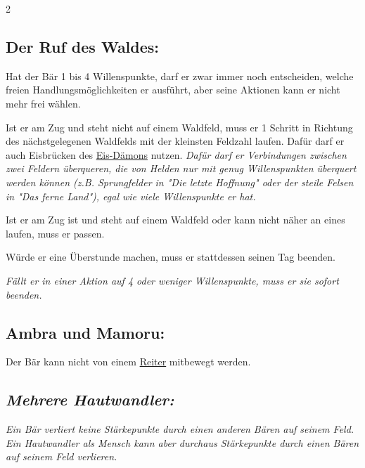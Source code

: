 \documentclass[10pt, a4paper, oneside]{book}
\newcommand{\fan}[1]{\textit{#1}}
\begin{document}
\begin{multicols*}{2}
\begin{nobgcolor}
\subsection{Der Ruf des Waldes:}

Hat der Bär 1 bis 4 Willenspunkte, darf er zwar immer noch entscheiden, welche freien Handlungsmöglichkeiten er ausführt, aber seine Aktionen kann er nicht mehr frei wählen.  

Ist er am Zug und steht nicht auf einem Waldfeld, muss er 1 Schritt in Richtung des nächstgelegenen Waldfelds mit der kleinsten Feldzahl laufen. Dafür darf er auch Eisbrücken des \hyperref[eis-daemon]{Eis-Dämons} nutzen. \fan{Dafür darf er Verbindungen zwischen zwei Feldern überqueren, die von Helden nur mit genug Willenspunkten überquert werden können (z.B. Sprungfelder in "Die letzte Hoffnung" oder der steile Felsen in "Das ferne Land"), egal wie viele Willenspunkte er hat.}

Ist er am Zug ist und steht auf einem Waldfeld oder kann nicht näher an eines laufen, muss er passen. 

Würde er eine Überstunde machen, muss er stattdessen seinen Tag beenden.
\supercite{dh-baer}

\fan{Fällt er in einer Aktion auf 4 oder weniger Willenspunkte, muss er sie sofort beenden.}










\subsection{Ambra und Mamoru:}

Der Bär kann nicht von einem \hyperref[reiter]{Reiter} mitbewegt werden.
\supercite{dh-begleitheft}








\subsection{\fan{Mehrere Hautwandler:}}

\fan{Ein Bär verliert keine Stärkepunkte durch einen anderen Bären auf seinem Feld. Ein Hautwandler als Mensch kann aber durchaus Stärkepunkte durch einen Bären auf seinem Feld verlieren.}



\end{nobgcolor}





\end{multicols*}
\end{document}

